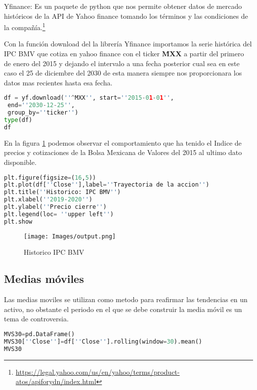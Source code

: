 \documentclass[letterpaper,12pt,oneside]{book}
\begin{document}
Yfinance: Es un paquete de python que nos permite obtener datos de mercado históricos de la API de Yahoo finance tomando los términos y las condiciones de la compañía.\footnote{\url{https://legal.yahoo.com/us/en/yahoo/terms/product-atos/apiforydn/index.html}}
\vspace{0.5cm}



Con la función download del la librería Yfinance importamos la serie histórica del IPC BMV que cotiza en yahoo finance con el ticker \textbf{\^ MXX} a partir del primero de enero del 2015 y dejando el intervalo a una fecha posterior cual sea en este caso el 25 de diciembre del 2030 de esta manera siempre nos proporcionara los datos mas recientes hasta esa fecha.

\begin{lstlisting}[language=Python]
df = yf.download(''^MXX'', start=''2015-01-01'',
 end=''2030-12-25'',
 group_by=''ticker'') 
type(df)
df
\end{lstlisting}


En la figura \ref{fig:m1} podemos observar el comportamiento que ha tenido el Indice de precios y cotizaciones de la Bolsa Mexicana de Valores del 2015 al ultimo dato disponible.

\begin{lstlisting}[language=Python]
plt.figure(figsize=(16,5))
plt.plot(df[''Close''],label=''Trayectoria de la accion'')
plt.title(''Historico: IPC BMV'')
plt.xlabel(''2019-2020'')
plt.ylabel(''Precio cierre'')
plt.legend(loc= ''upper left'')
plt.show
\end{lstlisting}

\begin{figure}[ht]
	\centering
	\texttt{[image: Images/output.png]}
	\caption{Historico IPC BMV}
	\label{fig:m1}
\end{figure}


\subsection{Medias móviles}

Las medias moviles se utilizan como metodo para reafirmar las tendencias en un activo, no obstante el periodo en el que se debe construir la media móvil es un tema de controversia.


\begin{lstlisting}[language=Python]
MVS30=pd.DataFrame()
MVS30[''Close'']=df[''Close''].rolling(window=30).mean()
MVS30
\end{lstlisting}
\end{document}
